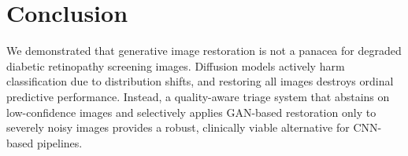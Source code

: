 \documentclass[runningheads]{llncs}
\begin{document}
\section{Conclusion}
We demonstrated that generative image restoration is not a panacea for degraded diabetic retinopathy screening images. Diffusion models actively harm classification due to distribution shifts, and restoring all images destroys ordinal predictive performance. Instead, a quality-aware triage system that abstains on low-confidence images and selectively applies GAN-based restoration only to severely noisy images provides a robust, clinically viable alternative for CNN-based pipelines.



\end{document}
